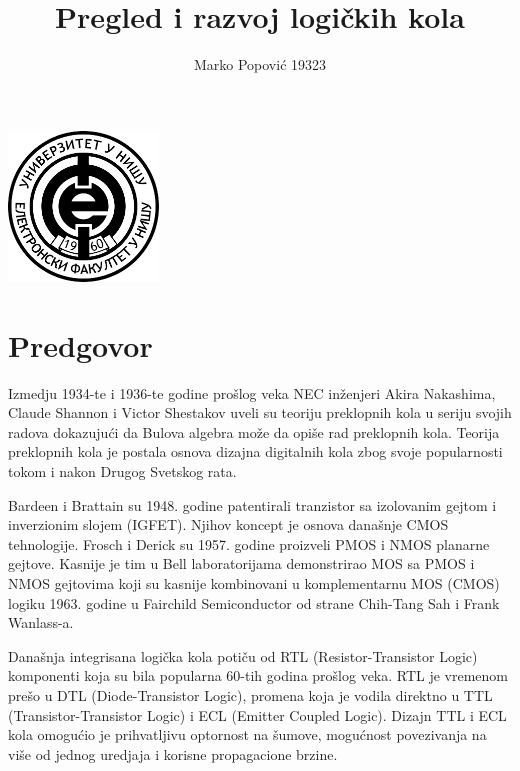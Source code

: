 \documentclass[12pt,a4paper]{article}
\title{Pregled i razvoj logičkih kola}
\author{Marko Popović 19323}
\begin{document}
\maketitle
\vspace{70pt}
\begin{center}
  \includegraphics[width=0.3\textwidth]{elfakL.png}
\end{center}
\newpage
\noindent\makebox[\linewidth]{\rule{0.8\paperwidth}{.4pt}}
\tableofcontents
\newpage
\noindent\makebox[\linewidth]{\rule{0.8\paperwidth}{.4pt}}
\section{Predgovor}
Izmedju 1934-te i 1936-te godine prošlog veka NEC inženjeri Akira Nakashima, Claude Shannon i Victor Shestakov uveli su teoriju preklopnih kola u seriju svojih radova dokazujući da Bulova algebra može da opiše rad preklopnih kola.
Teorija preklopnih kola je postala osnova dizajna digitalnih kola zbog svoje popularnosti tokom i nakon Drugog Svetskog rata.

Bardeen i Brattain su 1948. godine patentirali tranzistor sa izolovanim gejtom i inverzionim slojem (IGFET). Njihov koncept je osnova današnje CMOS tehnologije. Frosch i Derick su 1957. godine proizveli PMOS i NMOS planarne gejtove. Kasnije je tim u Bell laboratorijama demonstrirao MOS sa PMOS i NMOS gejtovima koji su kasnije kombinovani u komplementarnu MOS (CMOS) logiku 1963. godine u Fairchild Semiconductor od strane Chih-Tang Sah i Frank Wanlass-a.\cite{gates}

Današnja integrisana logička kola potiču od RTL (Resistor-Transistor Logic) komponenti koja su bila popularna 60-tih godina prošlog veka.
RTL je vremenom prešo u DTL (Diode-Transistor Logic), promena koja je vodila direktno u TTL (Transistor-Transistor Logic) i ECL (Emitter Coupled Logic).
Dizajn TTL i ECL kola omogućio je prihvatljivu optornost na šumove, mogućnost povezivanja na više od jednog uredjaja i korisne propagacione brzine.\cite{amd}


\newpage
\noindent\makebox[\linewidth]{\rule{0.8\paperwidth}{.4pt}}
\end{document}
